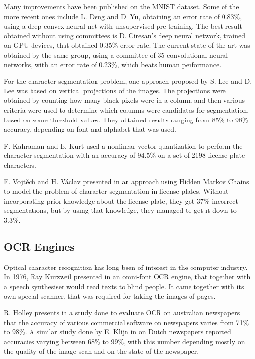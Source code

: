 Many improvements have been published on the MNIST dataset. Some of the more recent ones include L. Deng and D. Yu\cite{deng2011deep}, obtaining an error rate of 0.83\%, using a deep convex neural net with unsupervised pre-training. The best result obtained without using committees is D. Ciresan's deep neural network, trained on GPU devices\cite{Cire_an_2010}, that obtained 0.35\% error rate. The current state of the art was obtained by the same group, using a committee of 35 convolutional neural networks, with an error rate of 0.23\%, which beats human performance\cite{2012arXiv1202.2745C}. 

For the character segmentation problem, one approach proposed by S. Lee and D. Lee\cite{Dong_June_Lee} was based on vertical projections of the images. The projections were obtained by counting how many black pixels were in a column and then various criteria were used to determine which columns were candidates for segmentation, based on some threshold values. They obtained results ranging from 85\% to 98\% accuracy, depending on font and alphabet that was used. 

F. Kahraman and B. Kurt used a nonlinear vector quantization to perform the character segmentation\cite{kahraman2003license} with an accuracy of 94.5\% on a set of 2198 license plate characters. 

F. Vojt{\v{e}}ch and H. V{\'{a}}clav presented in \cite{Franc_2005} an approach using Hidden Markov Chains to model the problem of character segmentation in license plates. Without incorporating prior knowledge about the license plate, they got 37\% incorrect segmentations, but by using that knowledge, they managed to get it down to 3.3\%.

\subsection{OCR Engines}
Optical character recognition has long been of interest in the computer industry. In 1976, Ray Kurzweil presented in \cite{schantz1982history} an omni-font OCR engine, that together with a speech synthesiser would read texts to blind people. It came together with its own special scanner, that was required for taking the images of pages. 

R. Holley presents in a study\cite{Holley_2009} done to evaluate OCR on australian newspapers that the accuracy of various commercial software on newspapers varies from 71\% to 98\%. A similar study done by E. Klijn in \cite{klijn2008current} on Dutch newspapers reported accuracies varying between 68\% to 99\%, with this number depending mostly on the quality of the image scan and on the state of the newspaper. 

